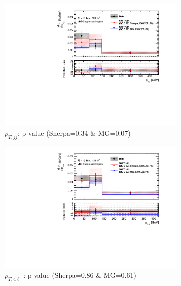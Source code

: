 \begin{figure}[!htb]
\begin{subfigure}{.49\textwidth}
        \centering
        \includegraphics[width=.98\linewidth]{figures/Results/CrossSection_VBSSuppressed/xs_ptjj_CR.pdf}
        \caption{ \footnotesize{$p_{T,jj}$}: p-value (Sherpa=0.34 $\&$ MG=0.07)}
    \end{subfigure}
    \begin{subfigure}{.49\textwidth}
        \centering
        \includegraphics[width=.98\linewidth]{figures/Results/CrossSection_VBSSuppressed/xs_pt4l_CR.pdf}
        \caption{ \footnotesize{$p_{T,4\ell}$ }: p-value (Sherpa=0.86 $\&$ MG=0.61)}
    \end{subfigure}\\
    \begin{subfigure}{.49\textwidth}
        \centering

\end{subfigure}
\end{figure}
